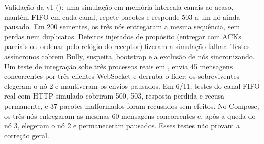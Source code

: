 \documentclass[11pt,a4paper]{article}
\newcommand{\msg}[1]{\texttt{\detokenize{#1}}}
\begin{document}
Validação da v1 (\msg{tests/}): uma simulação em memória intercala canais ao
acaso, mantém FIFO em cada canal, repete pacotes e responde 503 a um nó ainda
pausado. Em 200 sementes, os três nós entregaram a mesma sequência, sem perdas
nem duplicatas. Defeitos injetados de propósito (entregar com ACKs parciais ou
ordenar pelo relógio do receptor) fizeram a simulação falhar. Testes assíncronos
cobrem Bully, suspeita, bootstrap e a exclusão de nós sincronizando.
Um teste de integração sobe três processos reais em \msg{localhost}, envia 45
mensagens concorrentes por três clientes WebSocket e derruba o líder; os
sobreviventes elegeram o nó 2 e mantiveram os envios pausados. Em 6/11, testes
do canal FIFO real com HTTP simulado cobriram 500, 503, resposta perdida e recusa
permanente, e 37 pacotes malformados foram recusados sem efeitos. No Compose,
os três nós entregaram as mesmas 60 mensagens concorrentes e, após a queda do
nó 3, elegeram o nó 2 e permaneceram pausados. Esses testes não provam a
correção geral.
\end{document}
